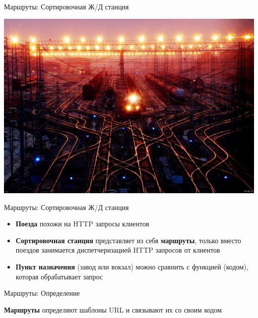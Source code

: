 \begin{frame}{Маршруты: Сортировочная Ж/Д станция}

  \begin{center}
    \vspace{-20pt}\includegraphics[width=\textwidth,height=\textheight,keepaspectratio]{media/routes.jpg}
  \end{center}

\end{frame}


\begin{frame}{Маршруты: Сортировочная Ж/Д станция}

  \begin{itemize}
    \item \textbf{Поезда} похожи на HTTP запросы клиентов
    \item \textbf{Сортировочная станция} представляет из себя
      \textbf{маршруты}, только вместо поездов занимается диспетчеризацией HTTP
      запросов от клиентов
    \item \textbf{Пункт назначения} (завод или вокзал) можно сравнить с
      функцией (кодом), которая обрабатывает запрос
  \end{itemize}

\end{frame}


\begin{frame}{Маршруты: Определение}

  \textbf{Маршруты} определяют шаблоны URL и связывают их со своим кодом

\end{frame}


